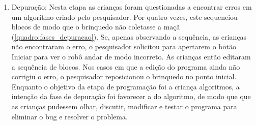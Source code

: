 \begin{enumerate}
    A complexidade da solução de cada uma das fases apresentadas é crescente. Enquanto a primeira fase exige apenas um comando, a segunda exige dois. A terceira fase também exige dois comandos, porém acrescenta o comando de giro. Além do maior número de comandos, a orientação da criança em relação ao RoPE é outro fator que dificulta a resolução. Nas fases 1 e 2 a criança programa o robô estando na mesma orientação que ele. Nas fases 3 a 5, porém, o robô está com seu lado direito voltado para a criança, e portanto ela precisa imaginar-se em outra perspectiva ou se mover para a mesma orientação que o brinquedo\footnote{Piaget e Inhelder (1981) citam a dificuldade que crianças têm de imaginar-se em outra perspectiva (egocentrismo).}.
    
    Dúvidas e erros surgiram com frequência durante a programação, e o pesquisador auxiliou fazendo perguntas e dando exemplos quando necessário, e explicando as regras e direções.
    
    \item Depuração: Nesta etapa as crianças foram questionadas a encontrar erros em um algoritmo criado pelo pesquisador. Por quatro vezes, este sequenciou blocos de modo que o brinquedo não coletasse a maçã (\autoref{quadro:fases_depuracao}). Se, apenas observando a sequência, as crianças não encontraram o erro, o pesquisador solicitou para apertarem o botão Iniciar para ver o robô andar de modo incorreto. As crianças então editaram a sequência de blocos. Nos casos em que a edição do programa ainda não corrigiu o erro, o pesquisador reposicionou o brinquedo no ponto inicial. Enquanto o objetivo da etapa de programação foi a criança  algoritmos, a intenção da fase de depuração foi favorecer a  do algoritmo, de modo que que as crianças pudessem olhar, discutir, modificar e testar o programa para eliminar o bug e resolver o problema.

\end{enumerate}

